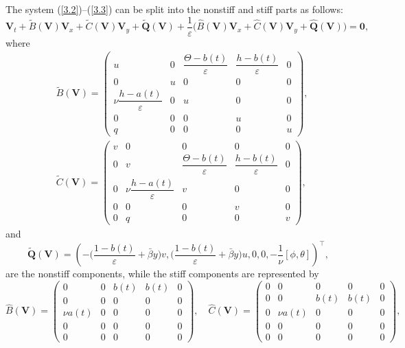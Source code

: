 \documentclass[a4paper,11pt,twoside]{article}
\numberwithin{equation}{section}
\numberwithin{figure}{section}
\numberwithin{table}{section}
\newcommand{\eps}{\varepsilon}
\newcommand{\bV}{\bm{V}}
\newcommand{\bQ}{\bm{Q}}
\newcommand\eref[1]{(\ref{#1})}
\begin{document}
The system \eref{3.2}--\eref{3.3} can be split into the nonstiff and stiff parts as follows:
\begin{equation}
\bV_t+\widetilde{B}(\bV)\bV_x+\widetilde{C}(\bV)\bV_y+\widetilde{\bQ}(\bV)+\frac{1}{\eps}\Big(\widehat{B}(\bV)\bV_x
+\widehat{C}(\bV)\bV_y+\widehat{\bQ}(\bV)\Big)=\bm0,
\label{3.4}
\end{equation}
where 
\begin{equation}
\begin{aligned}
&\widetilde{B}(\bV)=\begin{pmatrix}
u&0&\dfrac{\Theta-b(t)}{\eps}&\dfrac{h-b(t)}{\eps}&0\\0&u&0&0&0\\\nu\dfrac{h-a(t)}{\eps}&0&u&0&0\\0&0&0&u&0\\q&0&0&0&u
\end{pmatrix},\\[1ex]
&\widetilde{C}(\bV)=\begin{pmatrix}
v&0&0&0&0\\0&v&\dfrac{\Theta-b(t)}{\eps}&\dfrac{h-b(t)}{\eps}&0\\0&\nu\dfrac{h-a(t)}{\eps}&v&0&0\\0&0&0&v&0\\0&q&0&0&v
\end{pmatrix},
\end{aligned}
\label{3.5}
\end{equation}
and
\begin{equation}
\widetilde{\bQ}(\bV)=
\left(-\Big(\frac{1-b(t)}{\eps}+\bar{\beta}y\Big)v,\Big(\frac{1-b(t)}{\eps}+\bar{\beta}y\Big)u,0,0,-\frac{1}{\nu}[\phi,\theta]\right)^\top,
\label{3.6}
\end{equation}
are the nonstiff components, while the stiff components are represented by
\begin{equation}
\widehat{B}(\bV)=\begin{pmatrix}
0&0&b(t)&b(t)&0\\0&0&0&0&0\\\nu a(t)&0&0&0&0\\0&0&0&0&0\\0&0&0&0&0
\end{pmatrix},\quad
\widehat{C}(\bV)=\begin{pmatrix}
0&0&0&0&0\\0&0&b(t)&b(t)&0\\0&\nu a(t)&0&0&0\\0&0&0&0&0\\0&0&0&0&0
\end{pmatrix},
\label{3.7}
\end{equation}
\end{document}
